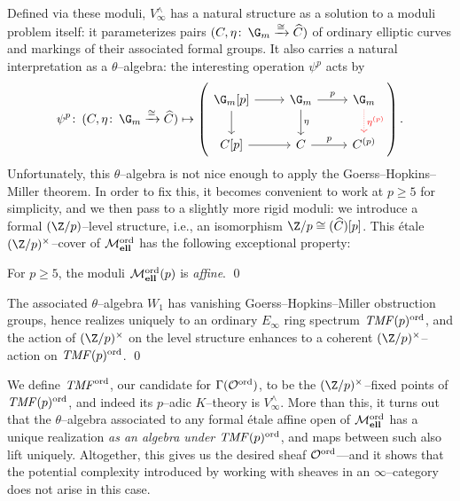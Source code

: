 \noindent Defined via these moduli, $V^\wedge_\infty$ has a natural structure as a solution to a moduli problem itself: it parameterizes pairs $(C, \eta\co \G_m \xrightarrow{\cong} \widehat C)$ of ordinary elliptic curves and markings of their associated formal groups.  It also carries a natural interpretation as a $\theta$--algebra: the interesting operation $\psi^p$ acts by
\[
\psi^p\co (C, \eta\co \G_m \xrightarrow\cong \widehat C) \mapsto \left(
\begin{tikzcd}
\G_m[p] \arrow{r} \arrow{d} & \G_m \arrow["p"]{r} \arrow["\eta"]{d} & \G_m \arrow[densely dotted, red, "\eta^{(p)}"]{d} \\
C[p]\arrow{r} & C \arrow["p"]{r} & C^{(p)}
\end{tikzcd}
\right).
\]
Unfortunately, this $\theta$--algebra is not nice enough to apply the Goerss--Hopkins--Miller theorem.  In order to fix this, it becomes convenient to work at $p \ge 5$ for simplicity, and we then pass to a slightly more rigid moduli: we introduce a formal $(\Z/p)$--level structure, i.e., an isomorphism $\Z/p \cong (\widehat C)[p]$.  This \'etale $(\Z/p)^\times$--cover of $\mathcal{M}_{\mathbf{ell}}^{\mathrm{ord}}$ has the following exceptional property:

\begin{lemma}[Igusa]
For $p \ge 5$, the moduli $\mathcal{M}_{\mathbf{ell}}^{\mathrm{ord}}(p)$ is \emph{affine}. \qed
\end{lemma}

\begin{corollary}
The associated $\theta$--algebra $W_1$ has vanishing Goerss--Hopkins--Miller obstruction groups, hence realizes uniquely to an ordinary $E_\infty$ ring spectrum $\mathit{TMF}(p)^{\mathrm{ord}}$, and the action of $(\Z/p)^\times$ on the level structure enhances to a coherent $(\Z/p)^\times$--action on $\mathit{TMF}(p)^{\mathrm{ord}}$. \qed
\end{corollary}

We define $\mathit{TMF}^{\mathrm{ord}}$, our candidate for $\Gamma(\mathcal{O}^{\mathrm{ord}})$, to be the $(\Z/p)^\times$--fixed points of $\mathit{TMF}(p)^{\mathrm{ord}}$, and indeed its $p$--adic $K$--theory is $V^\wedge_\infty$.  More than this, it turns out that the $\theta$--algebra associated to any formal \'etale affine open of $\mathcal{M}_{\mathbf{ell}}^{\mathrm{ord}}$ has a unique realization \emph{as an algebra under $\mathit{TMF}(p)^{\mathrm{ord}}$}, and maps between such also lift uniquely.  Altogether, this gives us the desired sheaf $\mathcal{O}^{\mathrm{ord}}$---and it shows that the potential complexity introduced by working with sheaves in an $\infty$--category does not arise in this case.

